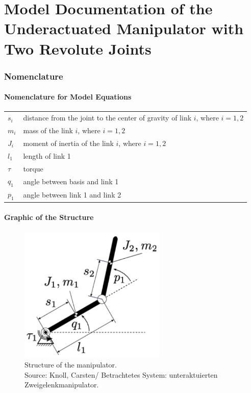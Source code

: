 \documentclass[10pt,a4paper]{article}
\begin{document}
	\part*{Model Documentation of the \\ Underactuated Manipulator with Two Revolute Joints} %
	
	
	\section{Nomenclature} %
	\subsection{Nomenclature for Model Equations} %
	
	\begin{tabular}{ll}
		$s_i$ & distance from the joint to the center of gravity of link $i$, where $i = 1,2$ \\
		$m_i$ & mass of the link $i$, where $i = 1,2$ \\
		$J_i$ & moment of inertia of the link $i$, where $i = 1,2$ \\
		$l_1$ & length of link 1 \\
		$\tau$ & torque \\
		$q_1$ & angle between basis and link 1\\
		$p_1$ & angle between link 1 and link 2\\
		
	\end{tabular}
	 
	
	\subsection{Graphic of the Structure}	
	\begin{figure}[H]
		\centering
		\captionsetup{justification=centering, margin=1cm}
		\includegraphics[width=70mm]{two_manipulator.pdf}
		\caption{Structure of the manipulator. \\ \footnotesize{Source: Knoll, Carsten/ Betrachtetes System: unteraktuierten Zweigelenkmanipulator.}}
	\end{figure}
	
\end{document}
